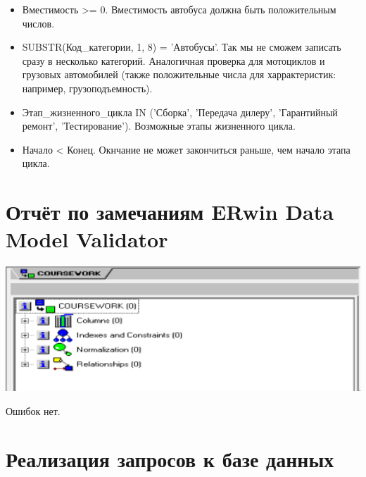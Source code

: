 \begin{itemize}
    \item Вместимость >= 0.
    Вместимость автобуса должна быть положительным числов.

    \item SUBSTR(Код\_категории, 1, 8) = 'Автобусы'.
    Так мы не сможем записать сразу в несколько категорий.
    Аналогичная проверка для мотоциклов и грузовых автомобилей (также положительные числа для харрактеристик: например, грузоподъемность).

    \item Этап\_жизненного\_цикла IN ('Сборка', 'Передача дилеру', 'Гарантийный ремонт', 'Тестирование').
    Возможные этапы жизненного цикла.

    \item Начало < Конец.
    Окнчание не может закончиться раньше, чем начало этапа цикла.

\end{itemize}

\section {Отчёт по замечаниям ERwin Data Model Validator}

\includegraphics[width=17cm]{./screenshots/validator/validator.png}

Ошибок нет.

\section{Реализация запросов к базе данных}

